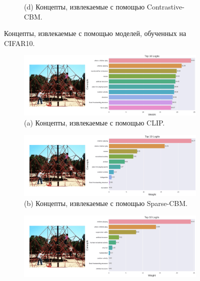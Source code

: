 \begin{figure}[h]
\begin{subfigure}
    \\
    (d) Концепты, извлекаемые с помощью Contrastive-CBM.
    \end{subfigure}
    \caption{Концепты, извлекаемые с помощью моделей, обученных на CIFAR10.}
    \label{fig:concepts_2}
\end{figure}

\begin{figure}[h] %
\centering
   \begin{subfigure}%
     \centering
    \includegraphics[width=0.75\linewidth]{./figures/clip_im_3-compressed.png}
    \\
    (a) Концепты, извлекаемые с помощью CLIP.
    \end{subfigure}
    \begin{subfigure}%
    \centering
      \includegraphics[width=0.75\linewidth]{./figures/sparse_im_3-compressed.png}
    \\
    (b) Концепты, извлекаемые с помощью Sparse-CBM.
    \end{subfigure}
    \begin{subfigure}%
     \centering
  \includegraphics[width=0.75\linewidth]{./figures/l1_im_3-compressed.png}

\end{subfigure}
\end{figure}
